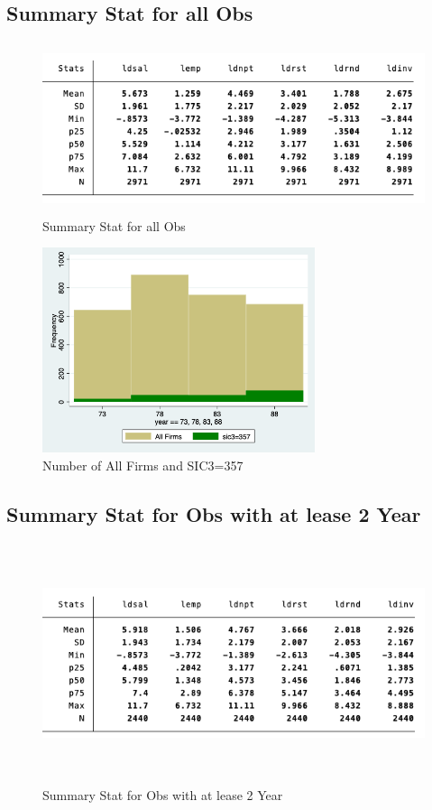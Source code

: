 \subsection{Summary Stat for all Obs}
\begin{figure}[h]
    \centering
    \includegraphics[height=5cm]{HW1/LATEX/Attachments/q1_stat_all.png}
    \caption{Summary Stat for all Obs}
    \label{fig:my_label}
\end{figure}

\begin{figure}[h]
    \centering
    \includegraphics[height=6cm]{HW1/LATEX/Attachments/q1_all.png}
    \caption{Number of All Firms and SIC3=357}
    \label{fig:my_label}
\end{figure}

\newpage
\subsection{Summary Stat for Obs with at lease 2 Year}
\begin{figure}[h]
    \centering
    \includegraphics[height=7cm]{HW1/LATEX/Attachments/q1_stat_2.png}
    \caption{Summary Stat for Obs with at lease 2 Year}
    \label{fig:my_label}
\end{figure}

